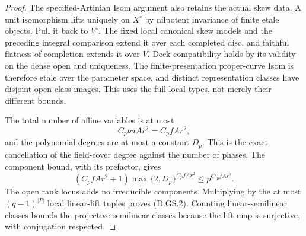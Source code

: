 \begin{proof}
The specified-Artinian Isom argument also retains
the actual skew data. A unit isomorphism lifts
uniquely on \(X^\circ\) by nilpotent invariance
of finite etale objects. Pull it back to
\(V^\circ\). The fixed local canonical skew
models and the preceding integral comparison
extend it over each completed disc, and
faithful flatness of completion extends it
over \(V\). Deck compatibility holds by its
validity on the dense open and uniqueness.
The finite-presentation proper-curve Isom is
therefore etale over the parameter space,
and distinct representation classes have
disjoint open class images. This uses the
full local types, not merely their different
bounds.

The total number of affine variables is at most
\[
       C_p\nu a A r^2=C_p f A r^2,
                                                        \tag{D.GS.17}
\]
and the polynomial degrees are at most a constant
\(D_p\). This is the exact cancellation of the
field-cover degree against the number of phases.
The component bound, with its prefactor, gives
\[
 (C_p f A r^2+1)\max\{2,D_p\}^{C_p f A r^2}
                              \le p^{C'_p f A r^2}.
                                                        \tag{D.GS.18}
\]
The open rank locus adds no irreducible components.
Multiplying by the at most \((q-1)^{|P|}\) local
linear-lift tuples proves (D.GS.2).
Counting linear-semilinear classes bounds the
projective-semilinear classes because the lift
map is surjective, with conjugation respected.
\end{proof}

